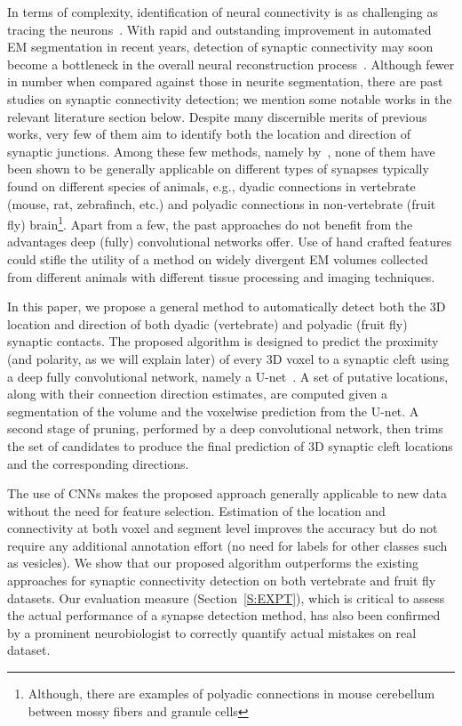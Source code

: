 \documentclass{llncs}
\begin{document}
In terms of complexity, identification of neural connectivity is as challenging as tracing the neurons~\cite{dorkenwald17syconn}. With rapid and outstanding improvement in automated EM segmentation in recent years, detection of synaptic connectivity may soon become a bottleneck in the overall neural reconstruction process~\cite{staffler17synem}. Although fewer in number when compared against those in neurite segmentation, there are past studies on synaptic connectivity detection; we mention some notable works in the relevant literature section below. Despite many discernible merits of previous works, very few of them aim to identify both the location and direction of synaptic junctions. Among these few methods, namely by~\cite{kreshuk15miccai}\cite{dorkenwald17syconn}\cite{staffler17synem}, none of them have been shown to be generally applicable on different types of synapses typically found on different species of animals, e.g., dyadic connections in vertebrate (mouse, rat, zebrafinch, etc.) and polyadic connections in non-vertebrate (fruit fly) brain\footnote{\scriptsize Although, there are examples of polyadic connections in mouse cerebellum between mossy fibers and granule cells}. Apart from a few, the past approaches do not benefit from the advantages deep (fully) convolutional networks offer. Use of hand crafted features could stifle the utility of a method on widely divergent EM volumes collected from different animals with different tissue processing and imaging techniques. 

In this paper, we propose a general method to automatically detect both the 3D location and direction of both dyadic (vertebrate) and polyadic (fruit fly) synaptic contacts. The proposed algorithm is designed to predict the proximity (and polarity, as we will explain later) of every 3D voxel to a synaptic cleft using a deep fully convolutional network, namely a U-net~\cite{ronneberger15unet}. A set of putative locations, along with their connection direction estimates, are computed given a segmentation of the volume and the voxelwise prediction from the U-net. A second stage of pruning, performed by a deep convolutional network, then trims the set of candidates to produce the final prediction of 3D synaptic cleft locations and the corresponding directions. 

The use of CNNs makes the proposed approach generally applicable to new data without the need for feature selection. Estimation of the location and connectivity at both voxel and segment level improves the accuracy but do not require any additional annotation effort (no need for labels for other classes such as vesicles). We show that our proposed algorithm outperforms the existing approaches for synaptic connectivity detection on both vertebrate and fruit fly datasets. Our evaluation measure (Section~\ref{S:EXPT}), which is critical to assess the actual performance of a synapse detection method, has also been confirmed by a prominent neurobiologist to correctly quantify actual mistakes on real dataset. 
\end{document}

